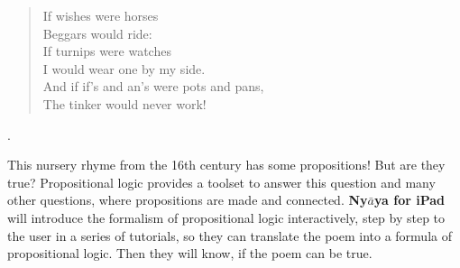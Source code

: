 


\begin{minipage}[t]{180mm}
\begin{verse}
If wishes were horses \\
Beggars would ride: \\
If turnips were watches \\
I would wear one by my side. \\
And if if's and an's were pots and pans, \\
The tinker would never work!
\end{verse}.
\end{minipage}

This nursery rhyme from the 16th century has some propositions! But are they true? 
Propositional logic provides a toolset to answer this question and many other questions,
where propositions are made and connected. {\bf Ny$\bar{a}$ya for iPad} 
will introduce the formalism of propositional logic interactively, 
step by step to the user in a series of tutorials, 
so they can translate the poem into a formula of propositional logic. 
Then they will know, if the poem can be true.
